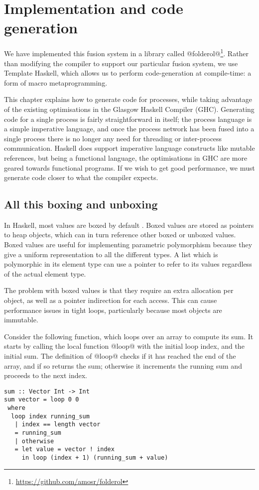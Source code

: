 \chapter{Implementation and code generation}
\label{chapter:process:implementation}


We have implemented this fusion system in a library called @folderol@\footnote{\url{https://github.com/amosr/folderol}}.
Rather than modifying the compiler to support our particular fusion system, we use Template Haskell, which allows us to perform code-generation at compile-time: a form of macro metaprogramming.

This chapter explains how to generate code for processes, while taking advantage of the existing optimisations in the Glasgow Haskell Compiler (GHC).
Generating code for a single process is fairly straightforward in itself; the process language is a simple imperative language, and once the process network has been fused into a single process there is no longer any need for threading or inter-process communication.
Haskell does support imperative language constructs like mutable references, but being a functional language, the optimisations in GHC are more geared towards functional programs.
If we wish to get good performance, we must generate code closer to what the compiler expects.

\section{All this boxing and unboxing}
In Haskell, most values are boxed by default \citep{jones1991unboxed}.
Boxed values are stored as pointers to heap objects, which can in turn reference other boxed or unboxed values.
Boxed values are useful for implementing parametric polymorphism because they give a uniform representation to all the different types.
A list which is polymorphic in its element type can use a pointer to refer to its values regardless of the actual element type.

The problem with boxed values is that they require an extra allocation per object, as well as a pointer indirection for each access.
This can cause performance issues in tight loops, particularly because most objects are immutable.

Consider the following function, which loops over an array to compute its sum.
It starts by calling the local function @loop@ with the initial loop index, and the initial sum.
The definition of @loop@ checks if it has reached the end of the array, and if so returns the sum; otherwise it increments the running sum and proceeds to the next index.
\begin{lstlisting}
sum :: Vector Int -> Int
sum vector = loop 0 0
 where
  loop index running_sum
   | index == length vector
   = running_sum
   | otherwise
   = let value = vector ! index
     in loop (index + 1) (running_sum + value)
\end{lstlisting}

